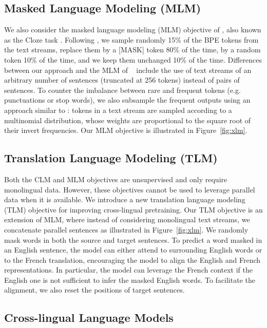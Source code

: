\documentclass[11pt,a4paper]{article}
\begin{document}
\subsection{Masked Language Modeling (MLM)}
We also consider the masked language modeling (MLM) objective of \citet{devlin2018bert}, also known as the Cloze task \cite{taylor1953cloze}. Following \citet{devlin2018bert}, we sample randomly 15\% of the BPE tokens from the text streams, replace them by a [MASK] token 80\% of the time, by a random token 10\% of the time, and we keep them unchanged 10\% of the time. Differences between our approach and the MLM of ~\citet{devlin2018bert} include the use of text streams of an arbitrary number of sentences (truncated at 256 tokens) instead of pairs of sentences. To counter the imbalance between rare and frequent tokens (e.g. punctuations or stop words), we also subsample the frequent outputs using an approach similar to \citet{mikolov2013distributed}: tokens in a text stream are sampled according to a multinomial distribution, whose weights are proportional to the square root of their invert frequencies. Our MLM objective is illustrated in Figure~\ref{fig:xlm}.

\subsection{Translation Language Modeling (TLM)}
Both the CLM and MLM objectives are unsupervised and only require monolingual data. However, these objectives cannot be used to leverage parallel data when it is available. We introduce a new translation language modeling (TLM) objective for improving cross-lingual pretraining. Our TLM objective is an extension of MLM, where instead of considering monolingual text streams, we concatenate parallel sentences as illustrated in Figure~\ref{fig:xlm}. We randomly mask words in both the source and target sentences. To predict a word masked in an English sentence, the model can either attend to surrounding English words or to the French translation, encouraging the model to align the English and French representations. In particular, the model can leverage the French context if the English one is not sufficient to infer the masked English words. To facilitate the alignment, we also reset the positions of target sentences.


\subsection{Cross-lingual Language Models}
\end{document}
